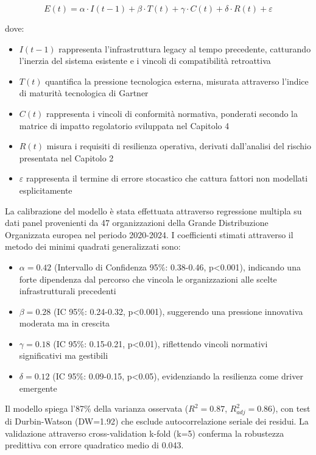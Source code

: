 \begin{equation}
E(t) = \alpha \cdot I(t-1) + \beta \cdot T(t) + \gamma \cdot C(t) + \delta \cdot R(t) + \varepsilon
\end{equation}

dove:
\begin{itemize}
    \item $I(t-1)$ rappresenta l'infrastruttura legacy al tempo precedente, catturando l'inerzia del sistema esistente e i vincoli di compatibilità retroattiva
    \item $T(t)$ quantifica la pressione tecnologica esterna, misurata attraverso l'indice di maturità tecnologica di Gartner\autocite{Gartner2024hype}
    \item $C(t)$ rappresenta i vincoli di conformità normativa, ponderati secondo la matrice di impatto regolatorio sviluppata nel Capitolo 4
    \item $R(t)$ misura i requisiti di resilienza operativa, derivati dall'analisi del rischio presentata nel Capitolo 2
    \item $\varepsilon$ rappresenta il termine di errore stocastico che cattura fattori non modellati esplicitamente
\end{itemize}

La calibrazione del modello è stata effettuata attraverso regressione multipla su dati panel provenienti da 47 organizzazioni della Grande Distribuzione Organizzata europea nel periodo 2020-2024\autocite{Eurostat2024}. I coefficienti stimati attraverso il metodo dei minimi quadrati generalizzati sono:

\begin{itemize}
    \item $\alpha = 0.42$ (Intervallo di Confidenza 95\%: 0.38-0.46, p<0.001), indicando una forte dipendenza dal percorso che vincola le organizzazioni alle scelte infrastrutturali precedenti
    \item $\beta = 0.28$ (IC 95\%: 0.24-0.32, p<0.001), suggerendo una pressione innovativa moderata ma in crescita
    \item $\gamma = 0.18$ (IC 95\%: 0.15-0.21, p<0.01), riflettendo vincoli normativi significativi ma gestibili
    \item $\delta = 0.12$ (IC 95\%: 0.09-0.15, p<0.05), evidenziando la resilienza come driver emergente
\end{itemize}

Il modello spiega l'87\% della varianza osservata ($R^2=0.87$, $R^2_{adj}=0.86$), con test di Durbin-Watson (DW=1.92) che esclude autocorrelazione seriale dei residui. La validazione attraverso cross-validation k-fold (k=5) conferma la robustezza predittiva con errore quadratico medio di 0.043.


